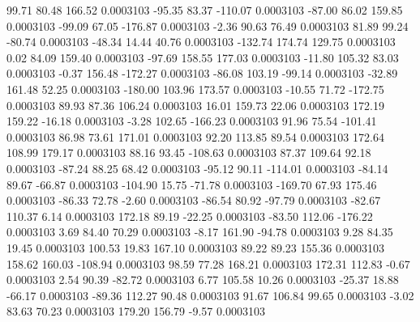        99.71       80.48      166.52     0.0003103
      -95.35       83.37     -110.07     0.0003103
      -87.00       86.02      159.85     0.0003103
      -99.09       67.05     -176.87     0.0003103
       -2.36       90.63       76.49     0.0003103
       81.89       99.24      -80.74     0.0003103
      -48.34       14.44       40.76     0.0003103
     -132.74      174.74      129.75     0.0003103
        0.02       84.09      159.40     0.0003103
      -97.69      158.55      177.03     0.0003103
      -11.80      105.32       83.03     0.0003103
       -0.37      156.48     -172.27     0.0003103
      -86.08      103.19      -99.14     0.0003103
      -32.89      161.48       52.25     0.0003103
     -180.00      103.96      173.57     0.0003103
      -10.55       71.72     -172.75     0.0003103
       89.93       87.36      106.24     0.0003103
       16.01      159.73       22.06     0.0003103
      172.19      159.22      -16.18     0.0003103
       -3.28      102.65     -166.23     0.0003103
       91.96       75.54     -101.41     0.0003103
       86.98       73.61      171.01     0.0003103
       92.20      113.85       89.54     0.0003103
      172.64      108.99      179.17     0.0003103
       88.16       93.45     -108.63     0.0003103
       87.37      109.64       92.18     0.0003103
      -87.24       88.25       68.42     0.0003103
      -95.12       90.11     -114.01     0.0003103
      -84.14       89.67      -66.87     0.0003103
     -104.90       15.75      -71.78     0.0003103
     -169.70       67.93      175.46     0.0003103
      -86.33       72.78       -2.60     0.0003103
      -86.54       80.92      -97.79     0.0003103
      -82.67      110.37        6.14     0.0003103
      172.18       89.19      -22.25     0.0003103
      -83.50      112.06     -176.22     0.0003103
        3.69       84.40       70.29     0.0003103
       -8.17      161.90      -94.78     0.0003103
        9.28       84.35       19.45     0.0003103
      100.53       19.83      167.10     0.0003103
       89.22       89.23      155.36     0.0003103
      158.62      160.03     -108.94     0.0003103
       98.59       77.28      168.21     0.0003103
      172.31      112.83       -0.67     0.0003103
        2.54       90.39      -82.72     0.0003103
        6.77      105.58       10.26     0.0003103
      -25.37       18.88      -66.17     0.0003103
      -89.36      112.27       90.48     0.0003103
       91.67      106.84       99.65     0.0003103
       -3.02       83.63       70.23     0.0003103
      179.20      156.79       -9.57     0.0003103
